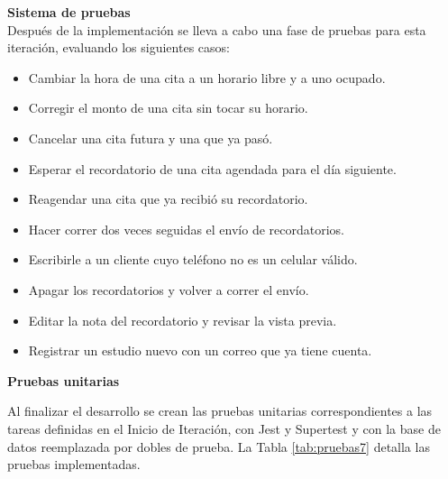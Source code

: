 \documentclass[12pt,letterpaper,oneside]{report}
\newcommand{\titulopar}[1]{\par\textbf{#1}\par}
\newcommand{\tituloparpegado}[1]{\par\textbf{#1}\\\indent\ignorespaces}
\begin{document}
\tituloparpegado{Sistema de pruebas}
Después de la implementación se lleva a cabo una fase de pruebas para esta iteración, evaluando los siguientes casos:

\begin{itemize}
  \item Cambiar la hora de una cita a un horario libre y a uno ocupado.
  \item Corregir el monto de una cita sin tocar su horario.
  \item Cancelar una cita futura y una que ya pasó.
  \item Esperar el recordatorio de una cita agendada para el día siguiente.
  \item Reagendar una cita que ya recibió su recordatorio.
  \item Hacer correr dos veces seguidas el envío de recordatorios.
  \item Escribirle a un cliente cuyo teléfono no es un celular válido.
  \item Apagar los recordatorios y volver a correr el envío.
  \item Editar la nota del recordatorio y revisar la vista previa.
  \item Registrar un estudio nuevo con un correo que ya tiene cuenta.
\end{itemize}

\vspace{\parskip}
\titulopar{Pruebas unitarias}
Al finalizar el desarrollo se crean las pruebas unitarias correspondientes a las tareas definidas en el Inicio de Iteración, con Jest y Supertest y con la base de datos reemplazada por dobles de prueba. La Tabla \ref{tab:pruebas7} detalla las pruebas implementadas.
\end{document}
